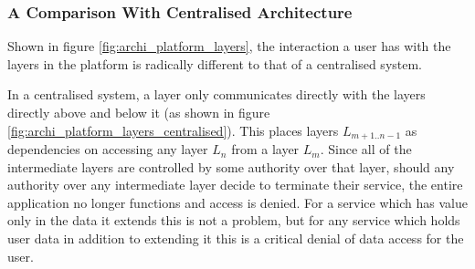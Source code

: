 \subsubsection{A Comparison With Centralised Architecture}

Shown in figure \ref{fig:archi_platform_layers}, the interaction a user has with the layers in the platform is radically different to that of a centralised system.

In a centralised system, a layer only communicates directly with the layers directly above and below it (as shown in figure \ref{fig:archi_platform_layers_centralised}). This places layers $L_{m+1..n-1}$ as dependencies on accessing any layer $L_{n}$ from a layer $L_{m}$. Since all of the intermediate layers are controlled by some authority over that layer, should any authority over any intermediate layer decide to terminate their service, the entire application no longer functions and access is denied. For a service which has value only in the data it extends this is not a problem, but for any service which holds user data in addition to extending it this is a critical denial of data access for the user. 


